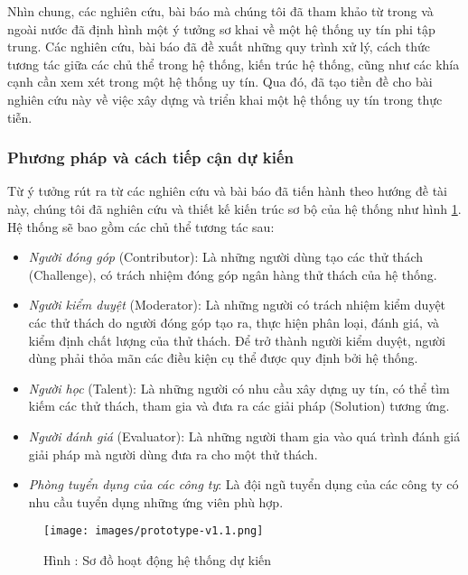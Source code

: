 \par
Nhìn chung, các nghiên cứu, bài báo mà chúng tôi đã tham khảo từ trong và ngoài nước đã định hình một ý tưởng sơ khai về một hệ thống uy tín phi tập trung. Các nghiên cứu, bài báo đã đề xuất những quy trình xử lý, cách thức tương tác giữa các chủ thể trong hệ thống, kiến trúc hệ thống, cũng như các khía cạnh cần xem xét trong một hệ thống uy tín. Qua đó, đã tạo tiền đề cho bài nghiên cứu này về việc xây dựng và triển khai một hệ thống uy tín trong thực tiễn.

\subsubsection*{\thesubsubsection\quad Phương pháp và cách tiếp cận dự kiến}
Từ ý tưởng rút ra từ các nghiên cứu và bài báo đã tiến hành theo hướng đề tài này, chúng tôi đã nghiên cứu và thiết kế kiến trúc sơ bộ của hệ thống như hình \ref{fig:architect}. Hệ thống sẽ bao gồm các chủ thể tương tác sau:
\begin{itemize}
  \item \textit{Người đóng góp} (Contributor): Là những người dùng tạo các thử thách (Challenge), có trách nhiệm đóng góp ngân hàng thử thách của hệ thống.
  \item \textit{Người kiểm duyệt} (Moderator): Là những người có trách nhiệm kiểm duyệt các thử thách do người đóng góp tạo ra, thực hiện phân loại, đánh giá, và kiểm định chất lượng của thử thách. Để trở thành người kiểm duyệt, người dùng phải thỏa mãn các điều kiện cụ thể được quy định bởi hệ thống.
  \item \textit{Người học} (Talent): Là những người có nhu cầu xây dựng uy tín, có thể tìm kiếm các thử thách, tham gia và đưa ra các giải pháp (Solution) tương ứng.
  \item \textit{Người đánh giá} (Evaluator): Là những người tham gia vào quá trình đánh giá giải pháp mà người dùng đưa ra cho một thử thách.
  \item \textit{Phòng tuyển dụng của các công ty}: Là đội ngũ tuyển dụng của các công ty có nhu cầu tuyển dụng những ứng viên phù hợp.
\end{itemize}

\begin{figure} [H]
  \centering
  \texttt{[image: images/prototype-v1.1.png]}
  \caption*{Hình \thefigure: Sơ đồ hoạt động hệ thống dự kiến}
  \label{fig:architect}
\end{figure}

